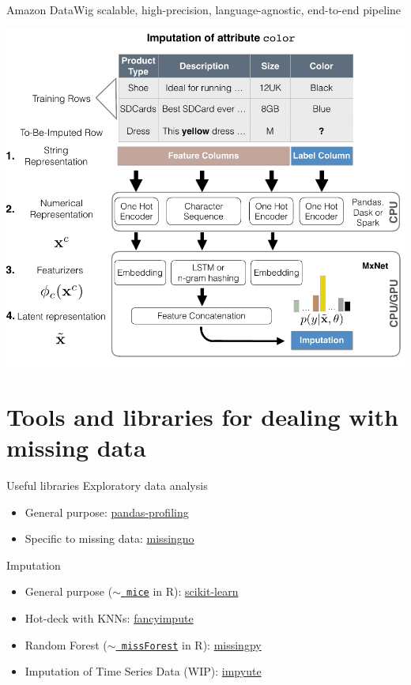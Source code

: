 \documentclass[aspectratio=43]{beamer}
\begin{document}
\begin{frame}{Amazon DataWig}
\small scalable, high-precision, language-agnostic, end-to-end pipeline

\centering\includegraphics[width=0.7\paperwidth]{datawig}
\end{frame}

\section{Tools and libraries for dealing with missing data}

\begin{frame}{Useful libraries}
Exploratory data analysis
\begin{itemize}
\item General purpose: \href{https://github.com/pandas-profiling/pandas-profiling}{pandas-profiling}
\item Specific to missing data: \href{https://github.com/ResidentMario/missingno}{missingno}
\end{itemize}
Imputation
\begin{itemize}
\item General purpose ($\sim$\href{https://cran.r-project.org/web/packages/mice/mice.pdf}{\texttt{ mice}} in R): \href{https://scikit-learn.org/stable/modules/impute.html}{scikit-learn}
\item Hot-deck with KNNs: \href{https://github.com/iskandr/fancyimpute}{fancyimpute}
\item Random Forest ($\sim$\href{https://cran.r-project.org/web/packages/missForest/missForest.pdf}{\texttt{ missForest}} in R): \href{https://github.com/epsilon-machine/missingpy}{missingpy}
\item Imputation of Time Series Data (WIP): \href{https://github.com/eltonlaw/impyute}{impyute}
\end{itemize}
\end{frame}
\end{document}
